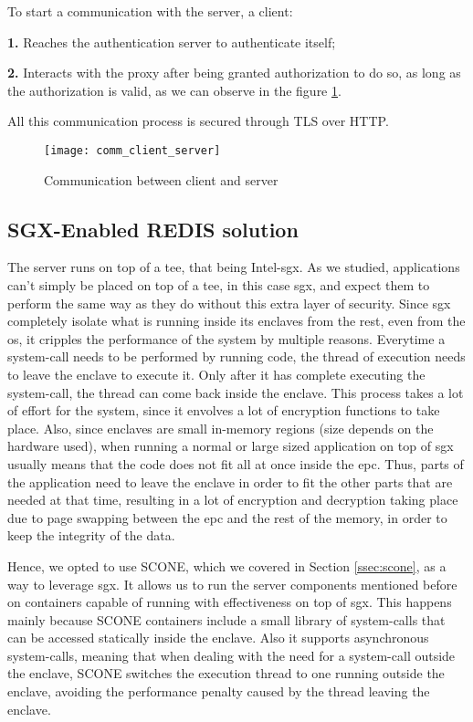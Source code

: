 To start a communication with the server, a client: 

\textbf{1.} Reaches the authentication server to authenticate itself;

\textbf{2.} Interacts with the proxy after being granted authorization to do so, as long as the authorization is valid, as we can observe in the figure \ref{fig:client_serverModel}. 

All this communication process is secured through TLS over HTTP.

\begin{figure}[htbp]
	\centering
	{\texttt{[image: comm\_client\_server]}}
	\caption{Communication between client and server}
	\label{fig:client_serverModel}
\end{figure}



\subsection{SGX-Enabled REDIS solution} %

The server runs on top of a \gls{tee}, that being Intel-\gls{sgx}. As we studied, applications can't simply be placed on top of a \gls{tee}, in this case \gls{sgx}, and expect them to perform the same way as they do without this extra layer of security. 
Since \gls{sgx} completely isolate what is running inside its enclaves from the rest, even from the \gls{os}, it cripples the performance of the system by multiple reasons. Everytime a system-call needs to be performed by running code, the thread of execution needs to leave the enclave to execute it. Only after it has complete executing the system-call, the thread can come back inside the enclave. This process takes a lot of effort for the system, since it envolves a lot of encryption functions to take place. 
Also, since enclaves are small in-memory regions (size depends on the hardware used), when running a normal or large sized application on top of \gls{sgx} usually means that the code does not fit all at once inside the \gls{epc}. 
Thus, parts of the application need to leave the enclave in order to fit the other parts that are needed at that time, resulting in a lot of encryption and decryption taking place due to page swapping between the \gls{epc} and the rest of the memory, in order to keep the integrity of the data.  

Hence, we opted to use SCONE, which we covered in Section  \ref{ssec:scone}, as a way to leverage \gls{sgx}. It allows us to run the server components mentioned before on containers capable of running with effectiveness on top of \gls{sgx}. This happens mainly because SCONE containers include a small library of system-calls that can be accessed statically inside the enclave. Also it supports asynchronous system-calls, meaning that when dealing with the need for a system-call outside the enclave, SCONE switches the execution thread to one running outside the enclave, avoiding the performance penalty caused by the thread leaving the enclave. 

